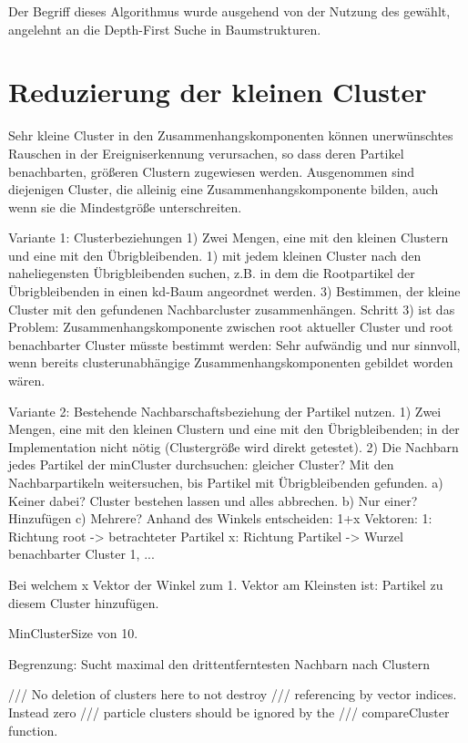 Der Begriff dieses Algorithmus wurde ausgehend von der Nutzung des  gewählt, angelehnt an die Depth-First Suche in Baumstrukturen.

\section{Reduzierung der kleinen Cluster}\label{sec:clusterreduktion}

Sehr kleine Cluster in den Zusammenhangskomponenten können unerwünschtes Rauschen in der Ereigniserkennung verursachen, so dass deren Partikel benachbarten, größeren Clustern zugewiesen werden. Ausgenommen sind diejenigen Cluster, die alleinig eine Zusammenhangskomponente bilden, auch wenn sie die Mindestgröße unterschreiten.

Variante 1: Clusterbeziehungen
1) Zwei Mengen, eine mit den kleinen Clustern und eine mit den Übrigbleibenden.
1) mit jedem kleinen Cluster nach den naheliegensten Übrigbleibenden suchen, z.B. in dem die Rootpartikel der Übrigbleibenden in einen kd-Baum angeordnet werden.
3) Bestimmen, der kleine Cluster mit den gefundenen Nachbarcluster zusammenhängen.
Schritt 3) ist das Problem: Zusammenhangskomponente zwischen root aktueller Cluster und root benachbarter Cluster müsste bestimmt werden: Sehr aufwändig und nur sinnvoll, wenn bereits clusterunabhängige Zusammenhangskomponenten gebildet worden wären.

Variante 2: Bestehende Nachbarschaftsbeziehung der Partikel nutzen.
1) Zwei Mengen, eine mit den kleinen Clustern und eine mit den Übrigbleibenden; in der Implementation nicht nötig (Clustergröße wird direkt getestet).
2) Die Nachbarn jedes Partikel der minCluster durchsuchen: gleicher Cluster? Mit den Nachbarpartikeln weitersuchen, bis Partikel mit Übrigbleibenden gefunden.
a) Keiner dabei? Cluster bestehen lassen und alles abbrechen.
b) Nur einer? Hinzufügen
c) Mehrere? Anhand des Winkels entscheiden:
1+x Vektoren:
1: Richtung root -> betrachteter Partikel
x: Richtung Partikel -> Wurzel benachbarter Cluster 1, ...

Bei welchem x Vektor der Winkel zum 1. Vektor am Kleinsten ist: Partikel zu diesem Cluster hinzufügen.

MinClusterSize von 10.

Begrenzung:
Sucht maximal den drittentferntesten Nachbarn nach Clustern

	/// No deletion of clusters here to not destroy
	/// referencing by vector indices. Instead zero
	/// particle clusters should be ignored by the
	/// compareCluster function.

